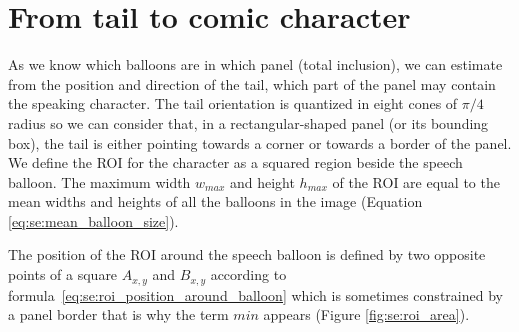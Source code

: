 


\section{From tail to comic character} %
\label{sec:se:tail_to_character}



As we know which balloons are in which panel (total inclusion), we can estimate from the position and direction of the tail, which part of the panel may contain the speaking character.
The tail orientation is quantized in eight cones of $\pi/4$ radius so we can consider that, in a rectangular-shaped panel (or its bounding box), the tail is either pointing towards a corner or towards a border of the panel.
We define the ROI for the character as a squared region beside the speech balloon.
The maximum width $w_{max}$ and height $h_{max}$ of the ROI are equal to the mean widths and heights of all the balloons in the image (Equation \ref{eq:se:mean_balloon_size}).

The position of the ROI around the speech balloon is defined by two opposite points of a square $A_{x,y}$ and $B_{x,y}$ according to formula~\ref{eq:se:roi_position_around_balloon} which is sometimes constrained by a panel border that is why the term $min$ appears (Figure \ref{fig:se:roi_area}).

